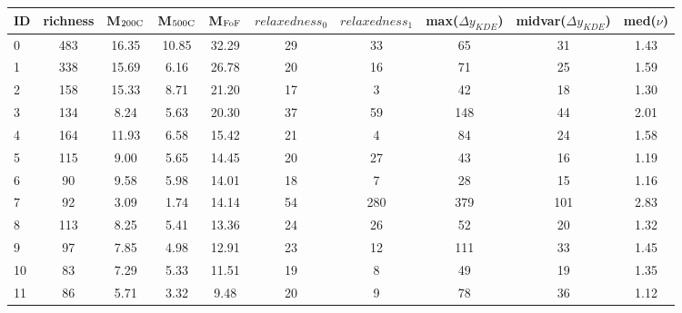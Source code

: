 \begin{tabular}{lccccccccc}
\toprule
ID & richness & M$_{\rm 200C}$ & M$_{\rm 500C}$ & M$_{\rm FoF}$ & $relaxedness_0$ & $relaxedness_1$ & max($\Delta y_{KDE}$) & midvar($\Delta y_{KDE}$) & med($\nu$) \\
\midrule
 0 &      483 &          16.35 &          10.85 &         32.29 &              29 &              33 &                    65 &                       31 &       1.43 \\
 1 &      338 &          15.69 &           6.16 &         26.78 &              20 &              16 &                    71 &                       25 &       1.59 \\
 2 &      158 &          15.33 &           8.71 &         21.20 &              17 &               3 &                    42 &                       18 &       1.30 \\
 3 &      134 &           8.24 &           5.63 &         20.30 &              37 &              59 &                   148 &                       44 &       2.01 \\
 4 &      164 &          11.93 &           6.58 &         15.42 &              21 &               4 &                    84 &                       24 &       1.58 \\
 5 &      115 &           9.00 &           5.65 &         14.45 &              20 &              27 &                    43 &                       16 &       1.19 \\
 6 &       90 &           9.58 &           5.98 &         14.01 &              18 &               7 &                    28 &                       15 &       1.16 \\
 7 &       92 &           3.09 &           1.74 &         14.14 &              54 &             280 &                   379 &                      101 &       2.83 \\
 8 &      113 &           8.25 &           5.41 &         13.36 &              24 &              26 &                    52 &                       20 &       1.32 \\
 9 &       97 &           7.85 &           4.98 &         12.91 &              23 &              12 &                   111 &                       33 &       1.45 \\
10 &       83 &           7.29 &           5.33 &         11.51 &              19 &               8 &                    49 &                       19 &       1.35 \\
11 &       86 &           5.71 &           3.32 &          9.48 &              20 &               9 &                    78 &                       36 &       1.12 \\

\end{tabular}
